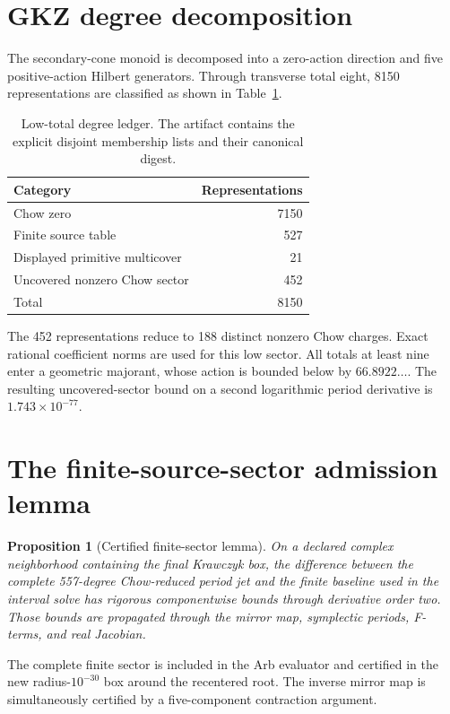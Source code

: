 \documentclass[11pt]{article}
\newtheorem{proposition}{Proposition}
\begin{document}
\section{GKZ degree decomposition}

The secondary-cone monoid is decomposed into a zero-action direction and five
positive-action Hilbert generators.  Through transverse total eight, 8150
representations are classified as shown in Table~\ref{tab:partition}.

\begin{table}[ht]
\centering
\begin{tabular}{lr}
\toprule
Category & Representations\\
\midrule
Chow zero & 7150\\
Finite source table & 527\\
Displayed primitive multicover & 21\\
Uncovered nonzero Chow sector & 452\\
\midrule
Total & 8150\\
\bottomrule
\end{tabular}
\caption{Low-total degree ledger. The artifact contains the explicit disjoint
membership lists and their canonical digest.}\label{tab:partition}
\end{table}

The 452 representations reduce to 188 distinct nonzero Chow charges.  Exact
rational coefficient norms are used for this low sector.  All totals at least
nine enter a geometric majorant, whose action is bounded below by
$66.8922\ldots$.  The resulting uncovered-sector bound on a second logarithmic
period derivative is $1.743\times10^{-77}$.

\section{The finite-source-sector admission lemma}

\begin{proposition}[Certified finite-sector lemma]\label{lem:finite}
On a declared complex neighborhood containing the final Krawczyk box, the
difference between the complete 557-degree Chow-reduced period jet and the
finite baseline used in the interval solve has rigorous componentwise bounds
through derivative order two.  Those bounds are propagated through the
mirror map, symplectic periods, F-terms, and real Jacobian.
\end{proposition}

The complete finite sector is included in the Arb evaluator and certified in
the new radius-$10^{-30}$ box around the recentered root. The inverse mirror
map is simultaneously certified by a five-component contraction argument.
\end{document}
